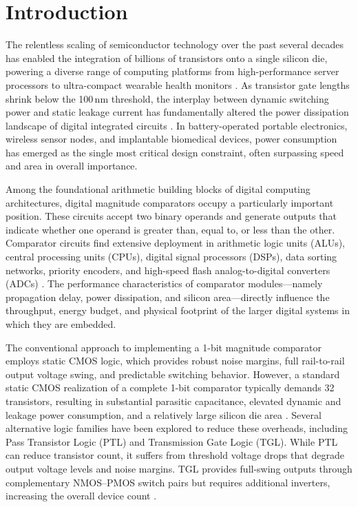 \documentclass[final,5p,times,twocolumn]{elsarticle}
\begin{document}
\section{Introduction}
\label{sec:introduction}

The relentless scaling of semiconductor technology over the past several decades has enabled the integration of billions of transistors onto a single silicon die, powering a diverse range of computing platforms from high-performance server processors to ultra-compact wearable health monitors \cite{rabaey2003}. As transistor gate lengths shrink below the 100\,nm threshold, the interplay between dynamic switching power and static leakage current has fundamentally altered the power dissipation landscape of digital integrated circuits \cite{roy2003,narendra2006}. In battery-operated portable electronics, wireless sensor nodes, and implantable biomedical devices, power consumption has emerged as the single most critical design constraint, often surpassing speed and area in overall importance.

Among the foundational arithmetic building blocks of digital computing architectures, digital magnitude comparators occupy a particularly important position. These circuits accept two binary operands and generate outputs that indicate whether one operand is greater than, equal to, or less than the other. Comparator circuits find extensive deployment in arithmetic logic units (ALUs), central processing units (CPUs), digital signal processors (DSPs), data sorting networks, priority encoders, and high-speed flash analog-to-digital converters (ADCs) \cite{weste2011,kang2003}. The performance characteristics of comparator modules---namely propagation delay, power dissipation, and silicon area---directly influence the throughput, energy budget, and physical footprint of the larger digital systems in which they are embedded.

The conventional approach to implementing a 1-bit magnitude comparator employs static CMOS logic, which provides robust noise margins, full rail-to-rail output voltage swing, and predictable switching behavior. However, a standard static CMOS realization of a complete 1-bit comparator typically demands 32 transistors, resulting in substantial parasitic capacitance, elevated dynamic and leakage power consumption, and a relatively large silicon die area \cite{baker2010}. Several alternative logic families have been explored to reduce these overheads, including Pass Transistor Logic (PTL) and Transmission Gate Logic (TGL). While PTL can reduce transistor count, it suffers from threshold voltage drops that degrade output voltage levels and noise margins. TGL provides full-swing outputs through complementary NMOS--PMOS switch pairs but requires additional inverters, increasing the overall device count \cite{rabaey2003}.
\end{document}
